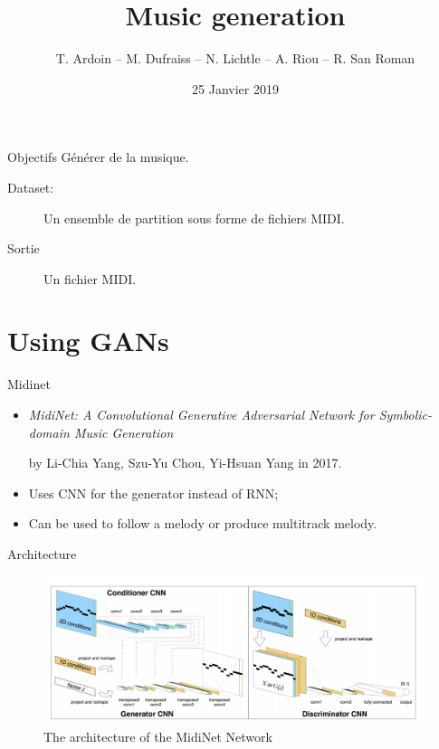 \documentclass{beamer}
\title{Music generation}
\author{T. Ardoin -- M. Dufraiss -- N. Lichtle -- A. Riou -- R. San Roman}
\date{25 Janvier 2019}
\begin{document}
\begin{frame}
	\maketitle
\end{frame}

\begin{frame}{Objectifs}
	Générer de la musique.
	\begin{description}
		\item[Dataset:] Un ensemble de partition sous forme de fichiers MIDI.
		\item[Sortie] Un fichier MIDI.
	\end{description}
\end{frame}

\section{Using GANs}
\begin{frame}{Midinet}
\begin{itemize}
	\item \textit{MidiNet: A Convolutional Generative Adversarial Network for Symbolic-domain Music Generation}
	
	by Li-Chia Yang, Szu-Yu Chou, Yi-Hsuan Yang in 2017.
	\item Uses CNN for the generator instead of RNN;
	\item Can be used to follow a melody or produce multitrack melody.
\end{itemize}
	
\end{frame}

\begin{frame}{Architecture}
\begin{figure}[h]
\centering
\includegraphics[width=1\linewidth]{midinet}
\caption{The architecture of the MidiNet Network}
\end{figure}
\end{frame}
\end{document}
